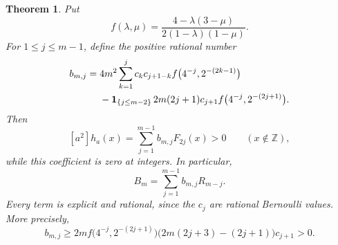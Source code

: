 \documentclass[11pt,a4paper]{article}
\newtheorem{theorem}{Theorem}[section]
\theoremstyle{remark}\newtheorem*{ednote}{Editorial note (ProveIt, 2026-10-01)}
\newcommand{\Z}{\mathbb Z}\newcommand{\T}{\mathbb T}\newcommand{\E}{\mathcal E}
\begin{document}
\newpage
\begin{theorem}\label{thm:finitebasis}
Put
\[
 f(\lambda,\mu)=\frac{4-\lambda(3-\mu)}{2(1-\lambda)(1-\mu)}.
\]
For $1\le j\le m-1$, define the positive rational number
\begin{align}
 b_{m,j}={}&4m^2\sum_{k=1}^j c_kc_{j+1-k}
 f\bigl(4^{-j},2^{-(2k-1)}\bigr)\notag\\
 &-\mathbf1_{\{j\le m-2\}}\,2m(2j+1)c_{j+1}
 f\bigl(4^{-j},2^{-(2j+1)}\bigr).\label{eq:bfinite}
\end{align}
Then
\begin{equation}\label{eq:pointwise}
 [a^2]h_a(x)=\sum_{j=1}^{m-1}b_{m,j}F_{2j}(x)>0
 \qquad(x\notin\Z),
\end{equation}
while this coefficient is zero at integers. In particular,
\begin{equation}\label{eq:Bfinite}
 B_m=\sum_{j=1}^{m-1}b_{m,j}R_{m-j}.
\end{equation}
Every term is explicit and rational, since the $c_j$ are rational Bernoulli values. More precisely,
\begin{equation}\label{eq:blower}
 b_{m,j}\ge2m f\bigl(4^{-j},2^{-(2j+1)}\bigr)
 \bigl(2m(2j+3)-(2j+1)\bigr)c_{j+1}>0.
\end{equation}
\end{theorem}
\end{document}
